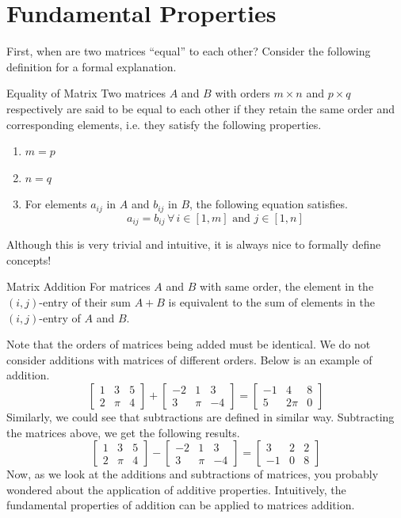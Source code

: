 \documentclass[../../main.tex]{subfiles}
\begin{document}
\section{Fundamental Properties}

First, when are two matrices ``equal'' to each other? Consider
the following definition for a formal explanation.

\begin{theorem}{}{Equality of Matrix}
Two matrices $A$ and $B$ with orders $m \times n$ and $p \times q$
respectively are said to be equal to each other if they retain
the same order and corresponding elements, i.e. they satisfy the
following properties.
\begin{enumerate}
\item $m = p$
\item $n = q$
\item
For elements $a_{ij}$ in $A$ and $b_{ij}$ in $B$, the following
equation satisfies.
\[
a_{ij} = b_{ij} \,
    \forall \, i \in [1, m] \text{ and } j \in [1, n]
\]
\end{enumerate}
\end{theorem}

Although this is very trivial and intuitive, it is always nice
to formally define concepts!

\begin{theorem}{}{Matrix Addition}
For matrices $A$ and $B$ with same order, the element in the
$(i, j)$-entry of their sum $A + B$ is equivalent to the sum of
elements in the $(i, j)$-entry of $A$ and $B$.
\end{theorem}

Note that the orders of matrices being added must be identical.
We do not consider additions with matrices of different orders.
Below is an example of addition.
\[
\begin{bmatrix}
    1 & 3   & 5 \\
    2 & \pi & 4
\end{bmatrix}
+
\begin{bmatrix}
    -2 & 1   & 3 \\
    3  & \pi & -4
\end{bmatrix}
=
\begin{bmatrix}
    -1 & 4    & 8 \\
    5  & 2\pi & 0
\end{bmatrix}
\]
Similarly, we could see that subtractions are defined in similar
way. Subtracting the matrices above, we get the following results.
\[
\begin{bmatrix}
    1 & 3   & 5 \\
    2 & \pi & 4
\end{bmatrix}
-
\begin{bmatrix}
    -2 & 1   & 3 \\
    3  & \pi & -4
\end{bmatrix}
=
\begin{bmatrix}
    3  & 2 & 2 \\
    -1 & 0 & 8
\end{bmatrix}
\]
Now, as we look at the additions and subtractions of matrices,
you probably wondered about the application of additive properties.
Intuitively, the fundamental properties of addition can be
applied to matrices addition.
\end{document}
